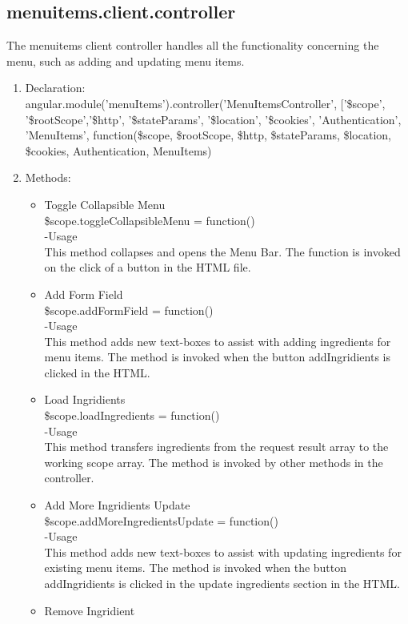 \documentclass[a4paper,12pt]{article}
\begin{document}
\subsection{menuitems.client.controller}
The menuitems client controller handles all the functionality concerning the menu, such as adding and updating menu items.
\begin{enumerate}
\item Declaration: \\angular.module('menuItems').controller('MenuItemsController', ['\$scope', '\$rootScope','\$http', '\$stateParams', '\$location', '\$cookies', 'Authentication', 'MenuItems',
	function(\$scope, \$rootScope, \$http, \$stateParams, \$location, \$cookies, Authentication, MenuItems)
	
\item Methods:
	\begin{itemize}
		\item Toggle Collapsible Menu\\
		\$scope.toggleCollapsibleMenu = function()\\
		-Usage\\
		This method collapses and opens the Menu Bar. The function is invoked on the click of a button in the HTML file.
		\item Add Form Field\\
		\$scope.addFormField = function()\\
		-Usage\\
		This method adds new text-boxes to assist with adding ingredients for menu items. The method is invoked when the button addIngridients is clicked in the HTML.
		\item Load Ingridients\\
		\$scope.loadIngredients = function()\\
		-Usage\\
		This method transfers ingredients from the request result array to the working scope array. The method is invoked by other methods in the controller.
		\item Add More Ingridients Update\\
		\$scope.addMoreIngredientsUpdate = function()\\
		-Usage\\
		This method adds new text-boxes to assist with updating ingredients for existing menu items. The method is invoked when the button addIngridients is clicked in the update ingredients section in the HTML.
		\item Remove Ingridient\\

\end{itemize}
\end{enumerate}
\end{document}
